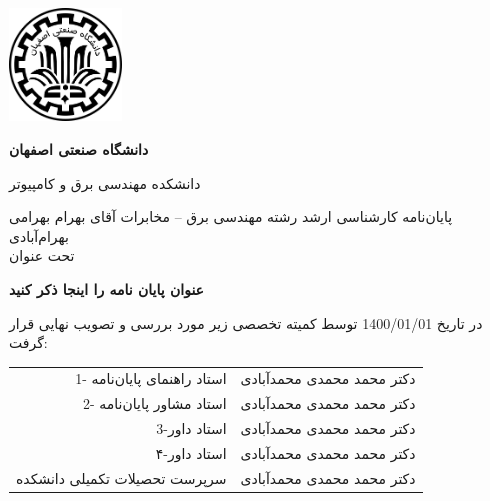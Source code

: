 \thispagestyle{empty}
\begin{center}
	\includegraphics[height=3cm]{images/iut_logo.png}
	\vspace{0.4cm}
	
	\textbf{دانشگاه صنعتی اصفهان}\\
	\vspace{0.4cm}
	
	{\large
		دانشکده مهندسی برق و کامپیوتر
	}
	\vspace{1.5cm}
	
	\vfill
	
	{\Large
		پایان‌نامه کارشناسی ارشد رشته مهندسی برق -- مخابرات آقای بهرام بهرامی بهرام‌آبادی\\
		\vspace{.3cm}
		تحت عنوان\\
	}
	
	
\end{center}
\vfill
\vspace{2.5cm}

{\large
	\textbf{عنوان پایان نامه را اینجا ذکر کنید}
}

\vspace*{2cm}

در تاریخ 1400/01/01 توسط کمیته تخصصی زیر مورد بررسی و تصویب نهایی قرار گرفت:\\
\vspace{0.8cm}

{\normalsize
	
	\begin{tabular}{rr}
		\vspace*{.8cm}
		1- استاد راهنمای پایان‌نامه  & \hspace{2cm} دکتر محمد محمدی محمدآبادی \\
		\vspace{.8cm}
		2- استاد مشاور پایان‌نامه  &\hspace{2cm} دکتر محمد محمدی محمدآبادی \\
		\vspace{.8cm}
		3-استاد داور&\hspace{2cm} دکتر محمد محمدی محمدآبادی \\
		\vspace{.8cm}
		۴-استاد داور &\hspace{2cm} دکتر محمد محمدی محمدآبادی \\
		\vspace{.8cm}
		سرپرست تحصیلات تکمیلی دانشکده &\hspace{2cm} دکتر محمد محمدی محمدآبادی\\
	\end{tabular}
}
\restoregeometry
\pagebreak


